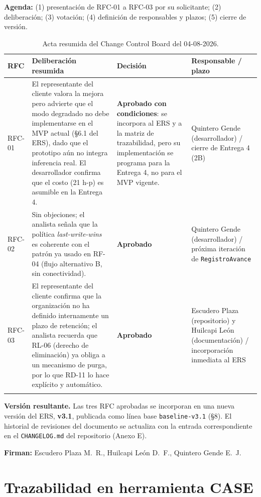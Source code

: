 \documentclass[11pt,a4paper]{article}
\begin{document}
\noindent\textbf{Agenda:} (1) presentación de RFC-01 a RFC-03 por su solicitante; (2)
deliberación; (3) votación; (4) definición de responsables y plazos; (5) cierre de versión.

\begin{longtable}{p{1.6cm}p{5.7cm}p{2.4cm}p{4cm}}
\toprule
\textbf{RFC} & \textbf{Deliberación resumida} & \textbf{Decisión} & \textbf{Responsable / plazo} \\
\midrule
\endhead
RFC-01 & El representante del cliente valora la mejora pero advierte que el modo degradado no debe implementarse en el MVP actual (\S6.1 del ERS), dado que el prototipo aún no integra inferencia real. El desarrollador confirma que el costo (21 h-p) es asumible en la Entrega 4. & \textbf{Aprobado con condiciones}: se incorpora al ERS y a la matriz de trazabilidad, pero su implementación se programa para la Entrega 4, no para el MVP vigente. & Quintero Gende (desarrollador) / cierre de Entrega 4 (2B) \\
RFC-02 & Sin objeciones; el analista señala que la política \emph{last-write-wins} es coherente con el patrón ya usado en RF-04 (flujo alternativo B, sin conectividad). & \textbf{Aprobado} & Quintero Gende (desarrollador) / próxima iteración de \texttt{RegistroAvance} \\
RFC-03 & El representante del cliente confirma que la organización no ha definido internamente un plazo de retención; el analista recuerda que RL-06 (derecho de eliminación) ya obliga a un mecanismo de purga, por lo que RD-11 lo hace explícito y automático. & \textbf{Aprobado} & Escudero Plaza (repositorio) y Huilcapi León (documentación) / incorporación inmediata al ERS \\
\bottomrule
\caption{Acta resumida del Change Control Board del 04-08-2026.}
\end{longtable}

\noindent\textbf{Versión resultante.} Las tres RFC aprobadas se incorporan en una nueva versión
del ERS, \textbf{v3.1}, publicada como línea base \texttt{baseline-v3.1} (\S8). El historial de
revisiones del documento se actualiza con la entrada correspondiente en el
\texttt{CHANGELOG.md} del repositorio (Anexo E).

\noindent\textbf{Firman:} Escudero Plaza M.\ R., Huilcapi León D.\ F., Quintero Gende E.\ J.

\section{Trazabilidad en herramienta CASE}
\end{document}
